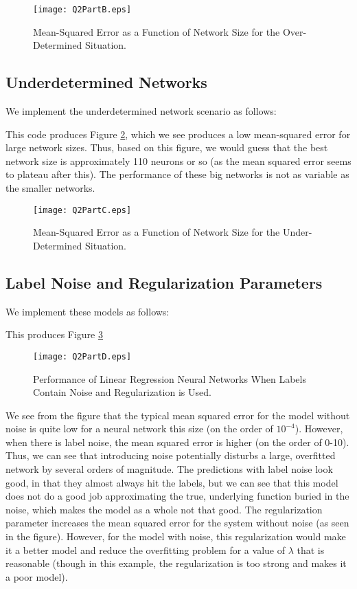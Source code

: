 \documentclass[11pt, oneside]{article}
\begin{document}
\begin{figure}[ht!]
\texttt{[image: Q2PartB.eps]}
\caption{Mean-Squared Error as a Function of Network Size for the Over-Determined Situation.}
\label{fig:overdetermined}
\end{figure}

\subsection{Underdetermined Networks}

We implement the underdetermined network scenario as follows:

This code produces Figure \ref{fig:underdetermined}, which we see produces a low mean-squared error for large network sizes. Thus, based on this figure, we would guess that the best network size is approximately 110 neurons or so (as the mean squared error seems to plateau after this). The performance of these big networks is not as variable as the smaller networks.

\begin{figure}[ht!]
\texttt{[image: Q2PartC.eps]}
\caption{Mean-Squared Error as a Function of Network Size for the Under-Determined Situation.}
\label{fig:underdetermined}
\end{figure}

\subsection{Label Noise and Regularization Parameters}

We implement these models as follows:

This produces Figure \ref{fig:noiseAndReg}

\begin{figure}[ht!]
\texttt{[image: Q2PartD.eps]}
\caption{Performance of Linear Regression Neural Networks When Labels Contain Noise and Regularization is Used.}
\label{fig:noiseAndReg}
\end{figure}

We see from the figure that the typical mean squared error for the model without noise is quite low for a neural network this size (on the order of $10^{-4}$). However, when there is label noise, the mean squared error is higher (on the order of 0-10). Thus, we can see that introducing noise potentially disturbs a large, overfitted network by several orders of magnitude. The predictions with label noise look good, in that they almost always hit the labels, but we can see that this model does not do a good job approximating the true, underlying function buried in the noise, which makes the model as a whole not that good. The regularization parameter increases the mean squared error for the system without noise (as seen in the figure). However, for the model with noise, this regularization would make it a better model and reduce the overfitting problem for a value of $\lambda$ that is reasonable (though in this example, the regularization is too strong and makes it a poor model).
\end{document}

